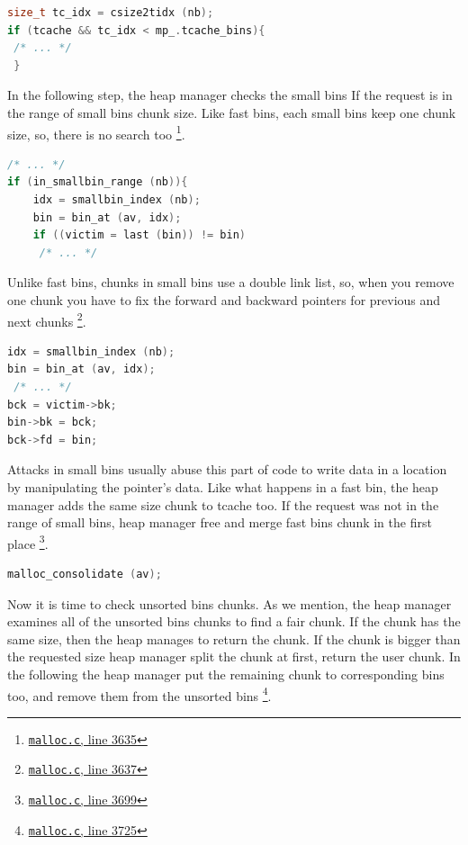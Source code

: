 \documentclass{masterthesis}
\newcommand*\tch{tcache}
\newcommand*\fb{fast bins}
\newcommand*\ub{unsorted bins}
\newcommand*\sbs{small bins}
\begin{document}
\begin{lstlisting}[language=c,frame=tlrb]
size_t tc_idx = csize2tidx (nb);
if (tcache && tc_idx < mp_.tcache_bins){
 /* ... */
 }
\end{lstlisting}

In the following step, the heap manager checks the \sbs{} If the request is in the range of \sbs{} chunk size. Like \fb{}, each \sbs{} keep one chunk size, so, there is no search too \footnote{\href{https://sourceware.org/git/?p=glibc.git;a=blob;f=malloc/malloc.c;h=f7cd29bc2f93e1082ee77800bd64a4b2a2897055;hb=9ea3686266dca3f004ba874745a4087a89682617\#l3635}{\texttt{malloc.c}, line 3635}}.

\begin{lstlisting}[language=c,frame=tlrb]
 /* ... */
if (in_smallbin_range (nb)){
	idx = smallbin_index (nb);
	bin = bin_at (av, idx);
	if ((victim = last (bin)) != bin)
	 /* ... */
\end{lstlisting}

Unlike \fb{}, chunks in \sbs{} use a double link list, so, when you remove one chunk you have to fix the forward and backward pointers for previous and next chunks \footnote{\href{https://sourceware.org/git/?p=glibc.git;a=blob;f=malloc/malloc.c;h=f7cd29bc2f93e1082ee77800bd64a4b2a2897055;hb=9ea3686266dca3f004ba874745a4087a89682617\#l3637}{\texttt{malloc.c}, line 3637}}.

\begin{lstlisting}[language=c,frame=tlrb]
idx = smallbin_index (nb);
bin = bin_at (av, idx);
 /* ... */
bck = victim->bk;
bin->bk = bck;
bck->fd = bin;
\end{lstlisting}

Attacks in \sbs{} usually abuse this part of code to write data in a location by manipulating the pointer's data. Like what happens in a fast bin, the heap manager adds the same size chunk to \tch{} too. If the request was not in the range of \sbs{}, heap manager free and merge \fb{} chunk in the first place \footnote{\href{https://sourceware.org/git/?p=glibc.git;a=blob;f=malloc/malloc.c;h=f7cd29bc2f93e1082ee77800bd64a4b2a2897055;hb=9ea3686266dca3f004ba874745a4087a89682617\#l3699}{\texttt{malloc.c}, line 3699}}.
\begin{lstlisting}[language=c,frame=tlrb]
malloc_consolidate (av);
\end{lstlisting}

Now it is time to check \ub{} chunks. As we mention, the heap manager examines all of the \ub{} chunks to find a fair chunk. If the chunk has the same size, then the heap manages to return the chunk. If the chunk is bigger than the requested size heap manager split the chunk at first, return the user chunk. In the following the heap manager put the remaining chunk to corresponding bins too, and remove them from the \ub{} \footnote{\href{https://sourceware.org/git/?p=glibc.git;a=blob;f=malloc/malloc.c;h=f7cd29bc2f93e1082ee77800bd64a4b2a2897055;hb=9ea3686266dca3f004ba874745a4087a89682617\#l3725}{\texttt{malloc.c}, line 3725}}.
\end{document}
